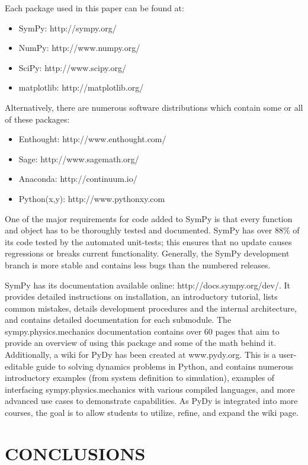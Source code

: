 \documentclass[twocolumn,10pt]{asme2e}
\begin{document}
Each package used in this paper can be found at:
\begin{itemize}
\item SymPy: http://sympy.org/
\item NumPy: http://www.numpy.org/
\item SciPy: http://www.scipy.org/
\item matplotlib: http://matplotlib.org/
\end{itemize}
Alternatively, there are numerous software distributions which contain some or
all of these packages:
\begin{itemize}
\item Enthought: http://www.enthought.com/
\item Sage: http://www.sagemath.org/
\item Anaconda: http://continuum.io/
\item Python(x,y): http://www.pythonxy.com
\end{itemize}

One of the major requirements for code added to SymPy is that every function
and object has to be thoroughly tested and documented.
SymPy has over 88\% of its code tested by the automated unit-tests; this
ensures that no update causes regressions or breaks current functionality.
Generally, the SymPy development branch is more stable and contains less bugs
than the numbered releases.

SymPy has its documentation available online: http://docs.sympy.org/dev/.
It provides detailed instructions on installation, an introductory tutorial,
lists common mistakes, details development procedures and the internal
architecture, and contains detailed documentation for each submodule.
The sympy.physics.mechanics documentation contains over 60 pages that aim to
provide an overview of using this package and some of the math behind it.
Additionally, a wiki for PyDy has been created at www.pydy.org.
This is a user-editable guide to solving dynamics problems in Python, and
contains numerous introductory examples (from system definition to simulation),
examples of interfacing sympy.physics.mechanics with various compiled
languages, and more advanced use cases to demonstrate capabilities.
As PyDy is integrated into more courses, the goal is to allow students to
utilize, refine, and expand the wiki page.



\section*{CONCLUSIONS}



\end{document}
